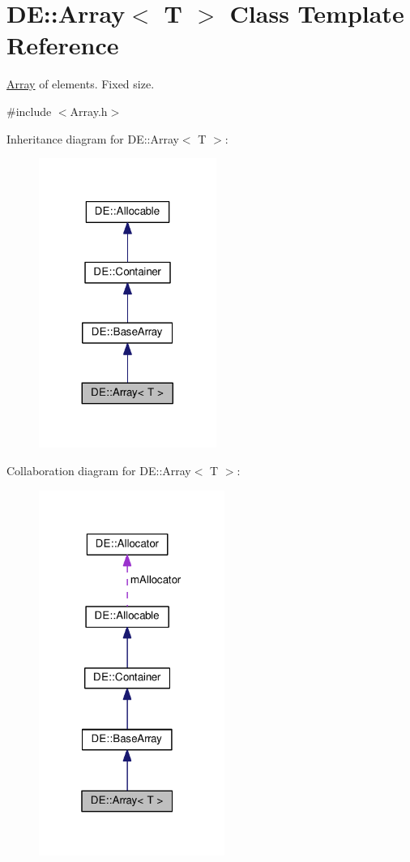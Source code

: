 \hypertarget{classDE_1_1Array}{}\section{DE\+:\+:Array$<$ T $>$ Class Template Reference}
\label{classDE_1_1Array}


\hyperlink{classDE_1_1Array}{Array} of elements. Fixed size.  




{\ttfamily \#include $<$Array.\+h$>$}



Inheritance diagram for DE\+:\+:Array$<$ T $>$\+:\nopagebreak
\begin{figure}[H]
\begin{center}
\leavevmode
\includegraphics[width=164pt]{classDE_1_1Array__inherit__graph}
\end{center}
\end{figure}


Collaboration diagram for DE\+:\+:Array$<$ T $>$\+:\nopagebreak
\begin{figure}[H]
\begin{center}
\leavevmode
\includegraphics[width=172pt]{classDE_1_1Array__coll__graph}
\end{center}
\end{figure}
